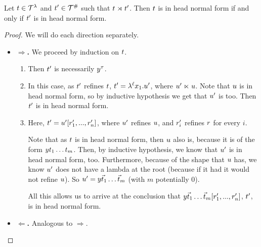 
\begin{lemma}
Let $t \in \mathcal{T}^{\lambda}$ and $t' \in \mathcal{T}^{\mathtt{\#}}$ such that $t \mathrel{\rtimes}  t'$.
Then $t$ is in head normal form if and only if $t'$ is in head normal form.
\end{lemma}
\begin{proof}
  We will do each direction separately.
\begin{itemize}
  \item[]{\bf $\Rightarrow$.}
    We proceed by induction on $t$.
    \begin{enumerate}
    \item {}
      Then $t'$ is necessarily $y^\tau$.
    \item {}
      In this case, as $t'$ refines $t$, $t' = \lambda^{\ell} x_1. u'$,
        where $u' \mathrel{\ltimes} u$.
      Note that $u$ is in head normal form, so by inductive hypothesis we get that $u'$ is too.
        Then $t'$ is in head normal form.
    \item {}
      Here, $t' = u' [r'_1, ..., r'_n]$,
        where $u'$ refines $u$, and $r'_i$ refines $r$ for every $i$.


      Note that as $t$ is in head normal form, then $u$ also is,
        because it is of the form $y t_1 \hdots t_m$.
        Then, by inductive hypothesis, we know that $u'$ is in head normal form, too.
        Furthermore, because of the
        shape that $u$ has, we know $u'$ does not have a lambda at the root
        (because if it had it would not refine $u$).
        So $u' = y \vec{t}_1 \hdots \vec{t}_m$ (with $m$ potentially $0$).

      All this allows us to arrive at the conclusion that
        $y \vec{t}_1 \hdots \vec{t}_m [r'_1, ..., r'_n]$, \ie $t'$, is in head normal form.
    \end{enumerate}

  \item[]{\bf $\Leftarrow$.} Analogous to $\Rightarrow$.
\end{itemize}
\end{proof}





